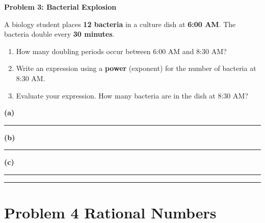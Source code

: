 \documentclass[11pt, a4paper]{article}
\newcommand{\answerline}{\par\vspace{0.5cm}\noindent\rule{\linewidth}{0.4pt}\par\vspace{0.1cm}}
\begin{document}
\begin{tcolorbox}[problem]
\textbf{Problem 3: Bacterial Explosion}

\medskip
A biology student places \textbf{12 bacteria} in a culture dish at \textbf{6:00 AM}. The bacteria
double every \textbf{30 minutes}.

\medskip
\begin{enumerate}[label=(\alph*)]
  \item How many doubling periods occur between 6:00 AM and 8:30 AM?

  \item Write an expression using a \textbf{power} (exponent) for the number of bacteria at 8:30 AM.

  \item Evaluate your expression. How many bacteria are in the dish at 8:30 AM?
\end{enumerate}
\end{tcolorbox}

\begin{tcolorbox}[answerbox]
\textbf{(a)} \answerline
\textbf{(b)} \answerline
\textbf{(c)} \answerline\answerline
\end{tcolorbox}

\clearpage


\section*{Problem 4 \hfill \normalfont\small\color{slate}Rational Numbers}
\end{document}
